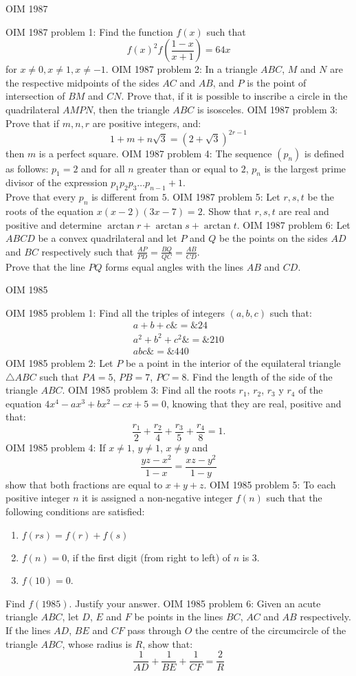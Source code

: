 OIM 1987 

OIM 1987 problem 1:  Find the function $f(x)$ such that
\[ f(x)^2f\left(\frac{1-x}{x+1}\right) =64x \]
for $x\not=0,x\not=1,x\not=-1$. 
OIM 1987 problem 2:  In a triangle $ABC$, $M$ and $N$ are the respective midpoints of the sides $AC$ and $AB$, and $P$ is the point of intersection of $BM$ and $CN$. Prove that, if it is possible to inscribe a circle in the quadrilateral $AMPN$, then the triangle $ABC$ is isosceles. 
OIM 1987 problem 3:  Prove that if $m,n,r$ are positive integers, and:
\[ 1+m+n\sqrt{3}=(2+\sqrt{3})^{2r-1} \]
then $m$ is a perfect square. 
OIM 1987 problem 4:  The sequence $(p_n)$ is defined as follows: $p_1=2$ and for all $n$ greater than or equal to $2$, $p_n$ is the largest prime divisor of the expression $p_1p_2p_3\ldots p_{n-1}+1$. \\
Prove that every $p_n$ is different from $5$. 
OIM 1987 problem 5:  Let $r,s,t$ be the roots of the equation $x(x-2)(3x-7)=2$. Show that $r,s,t$ are real and positive and determine $\arctan r+\arctan s +\arctan t$. 
OIM 1987 problem 6:  Let $ABCD$ be a convex quadrilateral and let $P$ and $Q$ be the points on the sides $AD$ and $BC$ respectively such that $\frac{AP}{PD}=\frac{BQ}{QC}=\frac{AB}{CD}$. \\
Prove that the line $PQ$ forms equal angles with the lines $AB$ and $CD$. 

OIM 1985 

OIM 1985 problem 1:  Find all the triples of integers $ (a, b,c)$ such that:
\[
\begin{array}{ccc}a+b+c \&=\& 24\\ a^2+b^2+c^2\&=\& 210\\ abc \&=\& 440\end{array}
\] 
OIM 1985 problem 2:  Let $ P$ be a point in the interior of the equilateral triangle $ \triangle{}ABC$ such that $ PA = 5$, $ PB = 7$, $ PC = 8$. Find the length of the side of the triangle $ ABC$. 
OIM 1985 problem 3:  Find all the roots $ r_1$, $ r_2$, $ r_3$ y $ r_4$ of the equation $ 4x^4-ax^3+bx^2-cx+5 = 0$, knowing that they are real, positive and that:
\[ \frac{r_1}{2}+\frac{r_2}{4}+\frac{r_3}{5}+\frac{r_4}{8}= 1. \] 
OIM 1985 problem 4:  If $ x\neq1$, $ y\neq1$, $ x\neq y$ and
\[ \frac{yz-x^2}{1-x}=\frac{xz-y^2}{1-y} \]
show that both fractions are equal to $ x+y+z$. 
OIM 1985 problem 5:  To each positive integer $ n$ it is assigned a non-negative integer $f(n)$ such that the following conditions are satisfied:
\begin{enumerate}[(1)]
  \item $ f(rs) = f(r)+f(s)$
  \item $ f(n) = 0$, if the first digit (from right to left) of $ n$ is 3.
  \item $ f(10) = 0$.
\end{enumerate}
Find $f(1985)$. Justify your answer. 
OIM 1985 problem 6:  Given an acute triangle $ABC$, let $D$, $E$ and $F$ be points in the lines $BC$, $AC$ and $AB$ respectively. If the lines $AD$, $BE$ and $CF$ pass through $O$ the centre of the circumcircle of the triangle $ABC$, whose radius is $R$, show that:
\[ \frac{1}{AD}+\frac{1}{BE}+\frac{1}{CF}=\frac{2}{R} \] 
